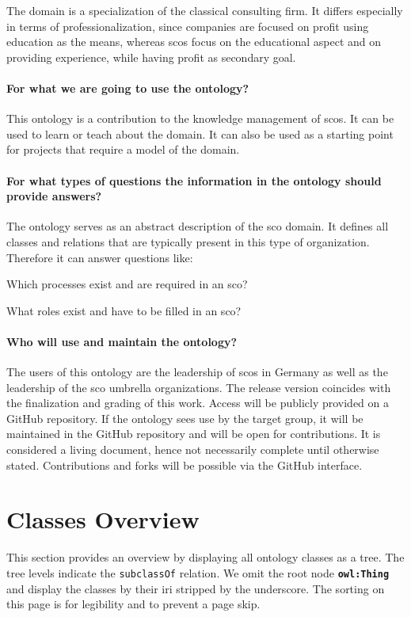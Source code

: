 \documentclass[a4paper, DIV=13, BCOR=0cm]{scrbook}
\newcommand{\class}[1]{\texttt{\textbf{#1}}}
\newcommand{\relation}[1]{\texttt{#1}}
\begin{document}
The domain is a specialization of the classical consulting firm. It differs especially in terms of professionalization, since companies are focused on profit using education as the means, whereas \glspl{sco} focus on the educational aspect and on providing experience, while having profit as secondary goal.

\paragraph{For what we are going to use the ontology?}
This ontology is a contribution to the knowledge management of \glspl{sco}. It can be used to learn or teach about the domain. It can also be used as a starting point for projects that require a model of the domain.

\paragraph{For what types of questions the information in the ontology should provide answers?}
The ontology serves as an abstract description of the \gls{sco} domain. It defines all classes and relations that are typically present in this type of organization. Therefore it can answer questions like:
\begin{compactitem}
	\item Which processes exist and are required in an \gls{sco}?
	\item What roles exist and have to be filled in an \gls{sco}?
\end{compactitem}

\paragraph{Who will use and maintain the ontology?}
The users of this ontology are the leadership of \glspl{sco} in Germany as well as the leadership of the \gls{sco} umbrella organizations. The release version coincides with the finalization and grading of this work. Access will be publicly provided on a GitHub repository. If the ontology sees use by the target group, it will be maintained in the GitHub repository and will be open for contributions. It is considered a living document, hence not necessarily complete until otherwise stated. Contributions and forks will be possible via the GitHub interface.

\section{Classes Overview}
This section provides an overview by displaying all ontology classes as a tree. The tree levels indicate the \relation{subclassOf} relation. We omit the root node \class{owl:Thing} and display the classes by their \gls{iri} stripped by the underscore. The sorting on this page is for legibility and to prevent a page skip.
\end{document}
